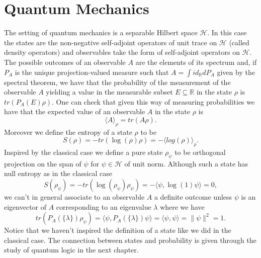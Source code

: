 \section{Quantum Mechanics}\label{sec:QM}

The setting of quantum mechanics is a separable Hilbert space $\mathcal{H}$. In this case the states are the non-negative self-adjoint operators of unit trace on $\mathcal{H}$ (called density operators) and observables take the form of self-adjoint operators on $\mathcal{H}$. The possible outcomes of an observable $A$ are the elements of its spectrum and, if $P_A$ is the unique projection-valued measure such that $A=\int id_\mathbb{R}dP_A$ given by the spectral theorem, we have that the probability of the measurement of the observable $A$ yielding a value in the measurable subset $E\subseteq\mathbb{R}$ in the state $\rho$ is $tr(P_A(E)\rho)$. One can check that given this way of measuring probabilities we have that the expected value of an observable $A$ in the state $\rho$ is
\begin{equation}\label{eq:quantum_states}
\langle A\rangle_\rho = tr(A\rho).
\end{equation}
Moreover we define the entropy of a state $\rho$ to be
\begin{equation}\label{eq:Q_entropy}
S(\rho)=-tr(\log(\rho)\rho)=-\langle log(\rho)\rangle_\rho.
\end{equation}
Inspired by the classical case we define a pure state $\rho_\psi$ to be orthogonal projection on the span of $\psi$ for $\psi\in\mathcal{H}$ of unit norm. Although such a state has null entropy as in the classical case
\begin{equation}
S(\rho_\psi)=-tr(\log(\rho_\psi)\rho_\psi)=-\langle\psi,\log(1)\psi\rangle = 0,
\end{equation} 
we can't in general associate to an observable $A$ a definite outcome unless $\psi$ is an eigenvector of $A$ corresponding to an eigenvalue $\lambda$ where we have 
\begin{equation}
tr(P_A(\{\lambda\})\rho_\psi)=\langle\psi,P_A(\{\lambda\})\psi\rangle=\langle\psi,\psi\rangle=\|\psi\|^2=1. 
\end{equation}
Notice that we haven't inspired the definition of a state like we did in the classical case. The connection between states and probability is given through the study of quantum logic in the next chapter.